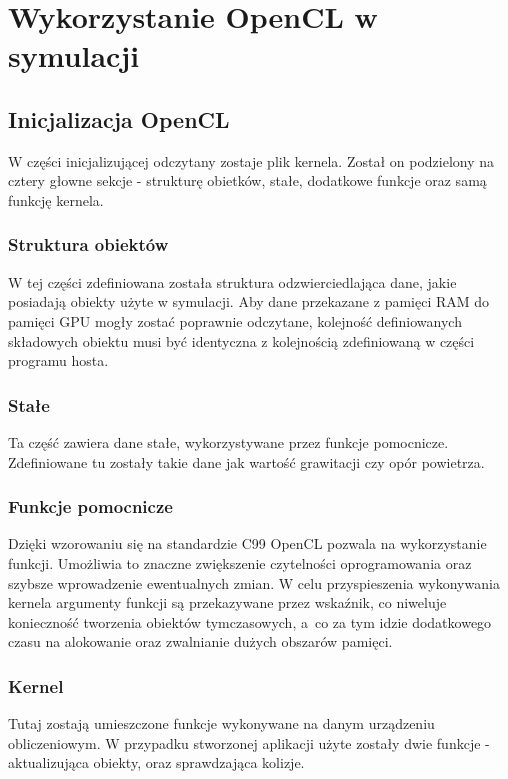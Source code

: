 \chapter{Wykorzystanie OpenCL w symulacji}

\section{Inicjalizacja OpenCL}
W części inicjalizującej odczytany zostaje plik kernela. Został on podzielony na cztery głowne sekcje - strukturę obietków, stałe, dodatkowe funkcje oraz samą funkcję kernela.

\subsection{Struktura obiektów}
W tej części zdefiniowana została struktura odzwierciedlająca dane, jakie posiadają obiekty użyte w symulacji. Aby dane przekazane z pamięci RAM do pamięci GPU mogły zostać poprawnie odczytane, kolejność definiowanych składowych obiektu musi być identyczna z kolejnością zdefiniowaną w części programu hosta.

\subsection{Stałe}
Ta część zawiera dane stałe, wykorzystywane przez funkcje pomocnicze. Zdefiniowane tu zostały takie dane jak wartość grawitacji czy opór powietrza.

\subsection{Funkcje pomocnicze}
Dzięki wzorowaniu się na standardzie C99 OpenCL pozwala na wykorzystanie funkcji. Umożliwia to znaczne zwiększenie czytelności oprogramowania oraz szybsze wprowadzenie ewentualnych zmian. W celu przyspieszenia wykonywania kernela argumenty funkcji są przekazywane przez wskaźnik, co niweluje konieczność tworzenia obiektów tymczasowych, a~co za tym idzie dodatkowego czasu na alokowanie oraz zwalnianie dużych obszarów pamięci.
\subsection{Kernel}
Tutaj zostają umieszczone funkcje wykonywane na danym urządzeniu obliczeniowym. W przypadku stworzonej aplikacji użyte zostały dwie funkcje - aktualizująca obiekty, oraz sprawdzająca kolizje.

